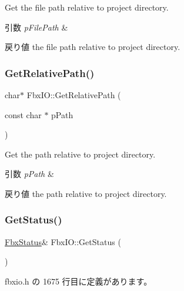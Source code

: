 Get the file path relative to project directory. 
\begin{DoxyParams}{引数}
{\em p\+File\+Path} & \\
\hline
\end{DoxyParams}
\begin{DoxyReturn}{戻り値}
the file path relative to project directory. 
\end{DoxyReturn}
\mbox{\label{class_fbx_i_o_a2b7384d5acf077a30157e844ceaf307a}} 
\subsubsection{\texorpdfstring{Get\+Relative\+Path()}{GetRelativePath()}}
{\footnotesize\ttfamily char$\ast$ Fbx\+I\+O\+::\+Get\+Relative\+Path (\begin{DoxyParamCaption}\item[{const char $\ast$}]{p\+Path }\end{DoxyParamCaption})}

Get the path relative to project directory. 
\begin{DoxyParams}{引数}
{\em p\+Path} & \\
\hline
\end{DoxyParams}
\begin{DoxyReturn}{戻り値}
the path relative to project directory. 
\end{DoxyReturn}
\mbox{\label{class_fbx_i_o_a26f7bc52b2e648a47a463b95287990b6}} 
\subsubsection{\texorpdfstring{Get\+Status()}{GetStatus()}}
{\footnotesize\ttfamily \hyperlink{class_fbx_status}{Fbx\+Status}\& Fbx\+I\+O\+::\+Get\+Status (\begin{DoxyParamCaption}{ }\end{DoxyParamCaption})\hspace{0.3cm}{\ttfamily [inline]}}



 fbxio.\+h の 1675 行目に定義があります。

\mbox{\label{class_fbx_i_o_a1ee478c9c4f1f7e1c2e9b635a52f446a}} 
